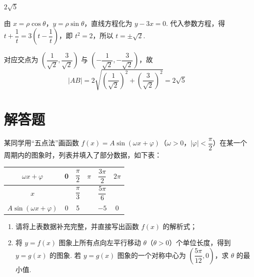 \begin{answer}
\(2\sqrt{5}\)
\end{answer}

\begin{solution}
由 \(x=\rho\cos\theta\)，\(y=\rho\sin\theta\)，直线方程化为 \(y-3x=0\). 代入参数方程，得
\(t+\dfrac1t=3\left(t-\dfrac1t\right)\)，即 \(t^2=2\)，所以 \(t=\pm\sqrt2\).

对应交点为 \(\left(\dfrac1{\sqrt2},\dfrac3{\sqrt2}\right)\) 与 \(\left(-\dfrac1{\sqrt2},-\dfrac3{\sqrt2}\right)\)，故
\[
|AB|=2\sqrt{\left(\frac1{\sqrt2}\right)^2+\left(\frac3{\sqrt2}\right)^2}=2\sqrt5
\]
\end{solution}

\section{解答题}

\begin{problem}
某同学用“五点法”画函数 \(f(x)=A\sin(\omega x+\varphi)\)（\(\omega>0\)，\(|\varphi|<\dfrac{\pi}{2}\)）在某一个周期内的图象时，列表并填入了部分数据，如下表：

\begin{center}
\renewcommand{\arraystretch}{1.25}
\begin{tabular}{|c|c|c|c|c|c|}
\hline
\(\omega x+\varphi\) & 0 & \(\dfrac{\pi}{2}\) & \(\pi\) & \(\dfrac{3\pi}{2}\) & \(2\pi\) \\
\hline
\(x\) &  & \(\dfrac{\pi}{3}\) &  & \(\dfrac{5\pi}{6}\) &  \\
\hline
\(A\sin(\omega x+\varphi)\) & 0 & 5 &  & \(-5\) & 0 \\
\hline
\end{tabular}
\end{center}

\begin{enumerate}
\item 请将上表数据补充完整，并直接写出函数 \(f(x)\) 的解析式；
\item 将 \(y=f(x)\) 图象上所有点向左平行移动 \(\theta\)（\(\theta>0\)）个单位长度，得到 \(y=g(x)\) 的图象. 若 \(y=g(x)\) 图象的一个对称中心为 \(\left(\dfrac{5\pi}{12},0\right)\)，求 \(\theta\) 的最小值.
\end{enumerate}
\end{problem}

